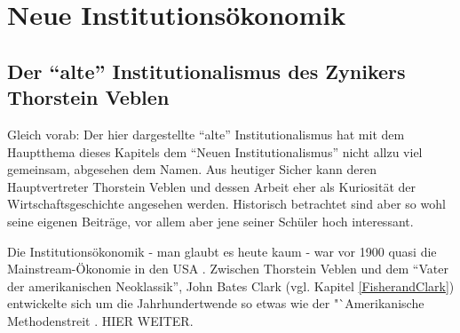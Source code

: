 %
%
%

\chapter{Neue Institutionsökonomik}
\label{Neue Institut}

\section{Der "`alte"' Institutionalismus des Zynikers Thorstein Veblen}

Gleich vorab: Der hier dargestellte "`alte"' Institutionalismus hat mit dem Hauptthema dieses Kapitels dem "`Neuen Institutionalismus"' nicht  allzu viel gemeinsam, abgesehen dem Namen. Aus heutiger Sicher kann deren Hauptvertreter Thorstein Veblen und dessen Arbeit eher als Kuriosität der Wirtschaftsgeschichte angesehen werden. Historisch betrachtet sind aber so wohl seine eigenen Beiträge, vor allem aber jene seiner Schüler hoch interessant.

Die Institutionsökonomik - man glaubt es heute kaum - war vor 1900 quasi die Mainstream-Ökonomie in den USA \parencite[S. 97]{Persky2000}. Zwischen Thorstein Veblen und dem "`Vater der amerikanischen Neoklassik"', John Bates Clark (vgl. Kapitel \ref{FisherandClark}) entwickelte sich um die Jahrhundertwende so etwas wie der "`Amerikanische Methodenstreit \parencite[S. 100]{Persky2000}.
HIER WEITER.




